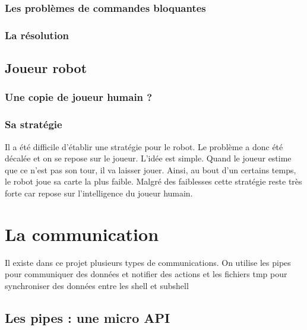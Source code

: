 \documentclass{article}
\begin{document}
\subsubsection{Les problèmes de commandes bloquantes}
\subsubsection{La résolution}

\subsection{Joueur robot}
\subsubsection{Une copie de joueur humain ?}
\subsubsection{Sa stratégie}
Il a été difficile d'établir une stratégie pour le robot. Le problème a donc été décalée et on se repose sur le joueur. L'idée est simple. Quand le joueur estime que ce n'est pas son tour, il va laisser jouer. Ainsi, au bout d'un certains temps, le robot joue sa carte la plus faible. Malgré des faiblesses cette stratégie reste très forte car repose sur l'intelligence du joueur humain. 

\section{La communication}

Il existe dans ce projet plusieurs types de communications. On utilise les pipes pour communiquer des données et notifier des actions et les fichiers tmp pour synchroniser des données entre les shell et subshell

\subsection{Les pipes : une micro API}
\end{document}
